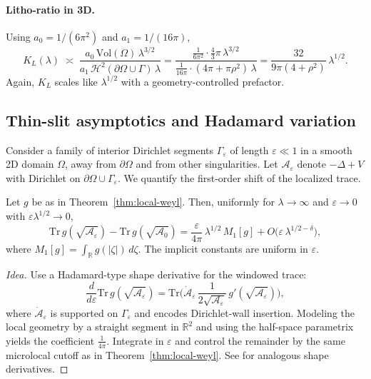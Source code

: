 \paragraph{Litho-ratio in 3D.}
Using $a_0=1/(6\pi^2)$ and $a_1=1/(16\pi)$,
\[
K_L(\lambda)\;\asymp\;\frac{a_0\,\mathrm{Vol}(\Omega)\,\lambda^{3/2}}
{a_1\,\mathcal{H}^{2}(\partial\Omega\cup\Gamma)\,\lambda}
= \frac{\frac{1}{6\pi^2}\cdot\frac{4}{3}\pi\,\lambda^{3/2}}
{\frac{1}{16\pi}\cdot(4\pi+\pi\rho^2)\,\lambda}
= \frac{32}{9\pi(4+\rho^2)}\,\lambda^{1/2}.
\]
Again, $K_L$ scales like $\lambda^{1/2}$ with a geometry-controlled prefactor.

\subsection{Thin-slit asymptotics and Hadamard variation}
\label{sub:thin-slit}

Consider a family of interior Dirichlet segments $\Gamma_\varepsilon$ of length $\varepsilon\ll 1$
in a smooth 2D domain $\Omega$, away from $\partial\Omega$ and from other singularities.
Let $\mathcal{A}_\varepsilon$ denote $-\Delta+V$ with Dirichlet on $\partial\Omega\cup\Gamma_\varepsilon$.
We quantify the first-order shift of the localized trace.

\begin{theorem}
\label{thm:small-crack}
Let $g$ be as in Theorem~\ref{thm:local-weyl}. Then, uniformly for $\lambda\to\infty$ and
$\varepsilon\to 0$ with $\varepsilon\lambda^{1/2}\to 0$,
\[
\mathrm{Tr}\,g(\sqrt{\mathcal{A}_\varepsilon})-\mathrm{Tr}\,g(\sqrt{\mathcal{A}_0})
= \frac{\varepsilon}{4\pi}\,\lambda^{1/2}\,M_1[g] + O\big(\varepsilon\,\lambda^{1/2-\delta}\big),
\]
where $M_1[g]=\int_{\mathbb{R}}g(|\zeta|)\,d\zeta$. The implicit constants are uniform in $\varepsilon$.
\end{theorem}

\begin{proof}[Idea]
Use a Hadamard-type shape derivative for the windowed trace:
\[
\frac{d}{d\varepsilon}\mathrm{Tr}\,g(\sqrt{\mathcal{A}_\varepsilon})
=\mathrm{Tr}\Big(\dot{\mathcal{A}}_\varepsilon\,\frac{1}{2\sqrt{\mathcal{A}_\varepsilon}}\,g'(\sqrt{\mathcal{A}_\varepsilon})\Big),
\]
where $\dot{\mathcal{A}}_\varepsilon$ is supported on $\Gamma_\varepsilon$
and encodes Dirichlet-wall insertion. Modeling the local geometry by a straight
segment in $\mathbb{R}^2$ and using the half-space parametrix yields the coefficient $\frac{1}{4\pi}$.
Integrate in $\varepsilon$ and control the remainder by the same microlocal cutoff as in
Theorem~\ref{thm:local-weyl}. See \cite{SafarovVassiliev1997,BrownHisLap} for analogous shape derivatives.
\end{proof}

